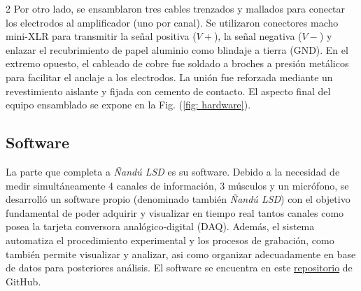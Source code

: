 \documentclass[11pt, letterpaper]{article}
\begin{document}
\begin{multicols*}{2}
Por otro lado, se ensamblaron tres cables trenzados y mallados para conectar los electrodos al amplificador (uno por canal). Se utilizaron conectores macho mini-XLR para transmitir la señal positiva ($V+$), la señal negativa ($V-$) y enlazar el recubrimiento de papel aluminio como blindaje a tierra (GND). En el extremo opuesto, el cableado de cobre fue soldado a broches a presión metálicos para facilitar el anclaje a los electrodos. La unión fue reforzada mediante un revestimiento aislante y fijada con cemento de contacto. El aspecto final del equipo ensamblado se expone en la Fig. (\ref{fig: hardware}).

\subsection{Software}

La parte que completa a \textit{Ñandú LSD} es su software. Debido a la necesidad de medir simultáneamente 4 canales de información, 3 músculos y un micrófono, se desarrolló un software propio (denominado también \textit{Ñandú LSD}) con el objetivo fundamental de poder adquirir y visualizar en tiempo real tantos canales como posea la tarjeta conversora analógico-digital (DAQ). Además, el sistema automatiza el procedimiento experimental y los procesos de grabación, %
como también permite visualizar y analizar, asi como organizar adecuadamente en base de datos para posteriores análisis. El software se encuentra en este \href{https://github.com/santiagopradorodriguez/Nandu_SistemadeAdqusicionEMG}{repositorio} de GitHub.


\end{multicols*}
\end{document}
